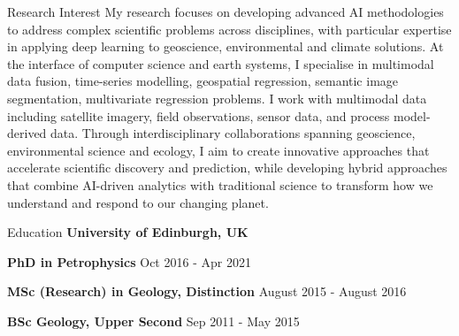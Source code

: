 \documentclass{resume} %
\newenvironment{indentpar}[1]%
  {\begin{list}{}%
          {\setlength{\leftmargin}{#1}}%
          \item[]%
  }
  {\end{list}}
\begin{document}
\begin{rSection}{Research Interest}
My research focuses on developing advanced AI methodologies to address complex scientific problems across disciplines, with particular expertise in applying deep learning to geoscience, environmental and climate solutions. At the interface of computer science and earth systems, I specialise in multimodal data fusion, time-series modelling, geospatial regression, semantic image segmentation, multivariate regression problems. I work with multimodal data including satellite imagery, field observations, sensor data, and process model-derived data. Through interdisciplinary collaborations spanning geoscience, environmental science and ecology, I aim to create innovative approaches that accelerate scientific discovery and prediction, while developing hybrid approaches that combine AI-driven analytics with traditional science to transform how we understand and respond to our changing planet.

\end{rSection}
\begin{rSection}{Education}
{\bf University of Edinburgh, UK} 

\begin{indentpar}{0.5cm}
\textbf{PhD in Petrophysics} \hfill {Oct 2016 - Apr 2021}

\textbf{MSc (Research) in Geology, Distinction} \hfill {August 2015 - August 2016}

\textbf{BSc Geology, Upper Second} \hfill {Sep 2011 - May 2015} 
\end{indentpar}

\end{rSection}
\end{document}
